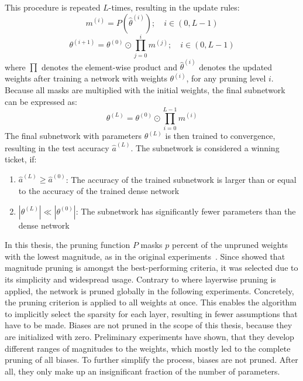 This procedure is repeated $L$-times, resulting in the update rules:
\[ m^{(i)} = \textit{P}(\hat \theta^{(i)}); \quad i \in (0,L-1) \]
\[ \theta^{(i+1)} = \theta^{(0)} \odot \prod_{j=0}^{i}m^{(j)}; \quad i \in (0,L-1) \] 
where $\prod$ denotes the element-wise product and $\hat \theta^{(i)}$ denotes the updated weights after training a network with weights $\theta^{(i)}$, for any pruning level $i$.
Because all masks are multiplied with the initial weights, the final subnetwork can be expressed as:
\[\theta^{(L)} = \theta^{(0)} \odot \prod_{i=0}^{L-1}m^{(i)} \]
The final subnetwork with parameters $\theta^{(L)}$ is then trained to convergence, resulting in the test accuracy $\hat a^{(L)}$.
The subnetwork is considered a winning ticket, if:
\begin{enumerate}
\item  $\hat a^{(L)} \geq \hat a^{(0)}$: The accuracy of the trained subnetwork is larger than or equal to the accuracy of the trained dense network
\item $|\theta^{(L)}| \ll |\theta^{(0)}|$: The subnetwork has significantly fewer parameters than the dense network
\end{enumerate}

In this thesis, the pruning function $P$ masks $p$ percent of the unpruned weights with the lowest magnitude, as in the original experiments~\autocite{LTH}. 
Since \autocite{Supermasks} showed that magnitude pruning is amongst the best-performing criteria, it was selected due to its simplicity and widespread usage.
Contrary to \autocite{LTH} where layerwise pruning is applied, the network is pruned globally in the following experiments.
Concretely, the pruning criterion is applied to all weights at once.
This enables the algorithm to implicitly select the sparsity for each layer, resulting in fewer assumptions that have to be made.
Biases are not pruned in the scope of this thesis, because they are initialized with zero.
Preliminary experiments have shown, that they develop different ranges of magnitudes to the weights, which mostly led to the complete pruning of all biases.
To further simplify the process, biases are not pruned.
After all, they only make up an insignificant fraction of the number of parameters. 

